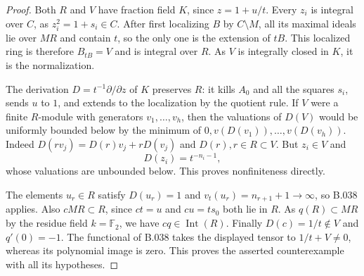 \begin{proof}
Both $R$ and $V$ have fraction field $K$, since $z=1+u/t$.
Every $z_i$ is integral over $C$, as $z_i^2=1+s_i\in C$.
After first localizing $B$ by $C\setminus M$, all its maximal
ideals lie over $MR$ and contain $t$, so the only one is the
extension of $tB$. This localized ring is therefore $B_{tB}=V$
and is integral over $R$. As $V$ is integrally closed in $K$,
it is the normalization.

The derivation $D=t^{-1}\partial/\partial z$ of $K$ preserves
$R$: it kills $A_0$ and all the squares $s_i$, sends $u$ to $1$,
and extends to the localization by the quotient rule.
If $V$ were a finite $R$-module with generators $v_1,\ldots,v_h$,
then the valuations of $D(V)$ would be uniformly bounded below
by the minimum of $0,v(D(v_1)),\ldots,v(D(v_h))$.
Indeed $D(rv_j)=D(r)v_j+rD(v_j)$ and $D(r),r\in R\subset V$.
But $z_i\in V$ and
\[
 D(z_i)=t^{-n_i-1},
\]
whose valuations are unbounded below. This proves nonfiniteness
directly.

The elements $u_r\in R$ satisfy $D(u_r)=1$ and
$v_t(u_r)=n_{r+1}+1\to\infty$, so B.038 applies.
Also $cMR\subset R$, since $ct=u$ and $cu=t s_0$ both lie in
$R$. As $q(R)\subset MR$ by the residue field $k=\mathbb F_2$,
we have $cq\in\operatorname{Int}(R)$.
Finally $D(c)=1/t\notin V$ and $q'(0)=-1$.
The functional of B.038 takes the displayed tensor to
$1/t+V\ne0$, whereas its polynomial image is zero.
This proves the asserted counterexample with all its hypotheses.
\end{proof}


